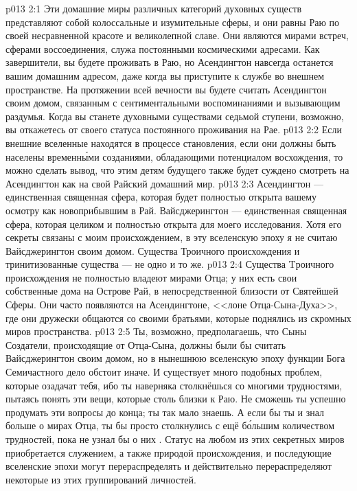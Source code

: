 \vs p013 2:1 Эти домашние миры различных категорий духовных существ представляют собой колоссальные и изумительные сферы, и они равны Раю по своей несравненной красоте и великолепной славе. Они являются мирами встреч, сферами воссоединения, служа постоянными космическими адресами. Как завершители, вы будете проживать в Раю, но Асендингтон навсегда останется вашим домашним адресом, даже когда вы приступите к службе во внешнем пространстве. На протяжении всей вечности вы будете считать Асендингтон своим домом, связанным с сентиментальными воспоминаниями и вызывающим раздумья. Когда вы станете духовными существами седьмой ступени, возможно, вы откажетесь от своего статуса постоянного проживания на Рае.
\vs p013 2:2 Если внешние вселенные находятся в процессе становления, если они должны быть населены временн\'ыми созданиями, обладающими потенциалом восхождения, то можно сделать вывод, что этим детям будущего также будет суждено смотреть на Асендингтон как на свой Райский домашний мир.
\vs p013 2:3 \pc Асендингтон --- единственная священная сфера, которая будет полностью открыта вашему осмотру как новоприбывшим в Рай. Вайсджерингтон --- единственная священная сфера, которая целиком и полностью открыта для моего исследования. Хотя его секреты связаны с моим происхождением, в эту вселенскую эпоху я не считаю Вайсджерингтон своим домом. Существа Троичного происхождения и тринитизованные существа --- не одно и то же.
\vs p013 2:4 \pc Существа Tроичного происхождения не полностью владеют мирами Отца; у них есть свои собственные дома на Острове Рай, в непосредственной близости от Святейшей Сферы. Они часто появляются на Асендингтоне, <<лоне Отца\hyp{}Сына\hyp{}Духа>>, где они дружески общаются со своими братьями, которые поднялись из скромных миров пространства.
\vs p013 2:5 \pc Ты, возможно, предполагаешь, что Сыны Создатели, происходящие от Отца\hyp{}Сына, должны были бы считать Вайсджерингтон своим домом, но в нынешнюю вселенскую эпоху функции Бога Семичастного дело обстоит иначе. И существует много подобных проблем, которые озадачат тебя, ибо ты наверняка столкнёшься со многими трудностями, пытаясь понять эти вещи, которые столь близки к Раю. Не сможешь ты успешно продумать эти вопросы до конца; ты так мало знаешь. А если бы ты и знал больше о мирах Отца, ты бы просто столкнулись с ещё б\'ольшим количеством трудностей, пока не узнал бы о них . Статус на любом из этих секретных миров приобретается служением, а также природой происхождения, и последующие вселенские эпохи могут перераспределять и действительно перераспределяют некоторые из этих группирований личностей.
